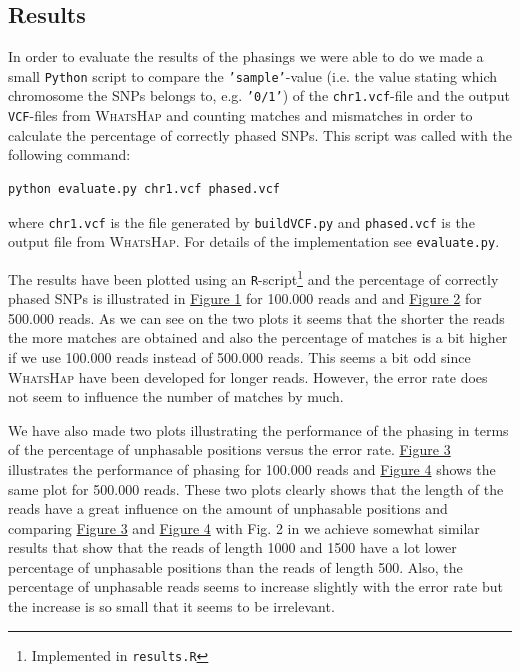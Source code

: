 \documentclass[10pt,a4paper]{article}
\begin{document}
\subsection{Results}
In order to evaluate the results of the phasings we were able to do we made a small \texttt{Python} script to compare the \texttt{'sample'}-value (i.e. the value stating which chromosome the SNPs belongs to, e.g. \texttt{'0/1'}) of the \texttt{chr1.vcf}-file and the output \texttt{VCF}-files from \textsc{WhatsHap} and counting matches and mismatches in order to calculate the percentage of correctly phased SNPs. This script was called with the following command:
\begin{lstlisting}
python evaluate.py chr1.vcf phased.vcf
\end{lstlisting}
where \texttt{chr1.vcf} is the file generated by \texttt{buildVCF.py} and \texttt{phased.vcf} is the output file from \textsc{WhatsHap}. For details of the implementation see \texttt{evaluate.py}.

The results have been plotted using an \texttt{R}-script\footnote{Implemented in \texttt{results.R}} and the percentage of correctly phased SNPs is illustrated in \hyperref[fig:100k]{Figure 1} for 100.000 reads and and \hyperref[fig:500k]{Figure 2} for 500.000 reads. As we can see on the two plots it seems that the shorter the reads the more matches are obtained and also the percentage of matches is a bit higher if we use 100.000 reads instead of 500.000 reads. This seems a bit odd since \textsc{WhatsHap} have been developed for longer reads. However, the error rate does not seem to influence the number of matches by much.

We have also made two plots illustrating the performance of the phasing in terms of the percentage of unphasable positions versus the error rate. \hyperref[fig:unphasable100k]{Figure 3} illustrates the performance of phasing for 100.000 reads and  \hyperref[fig:unphasable500k]{Figure 4} shows the same plot for 500.000 reads. These two plots clearly shows that the length of the reads have a great influence on the amount of unphasable positions and comparing \hyperref[fig:unphasable100k]{Figure 3} and \hyperref[fig:unphasable500k]{Figure 4} with Fig. 2 in \cite{whatshap} we achieve somewhat similar results that show that the reads of length 1000 and 1500 have a lot lower percentage of unphasable positions than the reads of length 500. Also, the percentage of unphasable reads seems to increase slightly with the error rate but the increase is so small that it seems to be irrelevant.
\end{document}

